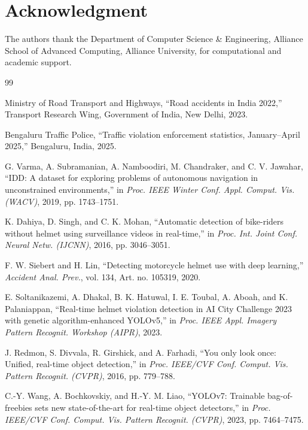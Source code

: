 \documentclass[conference]{IEEEtran}
\begin{document}
\section*{Acknowledgment}
The authors thank the Department of Computer Science \& Engineering, Alliance School of Advanced Computing, Alliance University, for computational and academic support.

\begin{thebibliography}{99}

Ministry of Road Transport and Highways, ``Road accidents in India 2022,'' Transport Research Wing, Government of India, New Delhi, 2023.

Bengaluru Traffic Police, ``Traffic violation enforcement statistics, January--April 2025,'' Bengaluru, India, 2025.

G. Varma, A. Subramanian, A. Namboodiri, M. Chandraker, and C. V. Jawahar, ``IDD: A dataset for exploring problems of autonomous navigation in unconstrained environments,'' in \emph{Proc. IEEE Winter Conf. Appl. Comput. Vis. (WACV)}, 2019, pp. 1743--1751.

K. Dahiya, D. Singh, and C. K. Mohan, ``Automatic detection of bike-riders without helmet using surveillance videos in real-time,'' in \emph{Proc. Int. Joint Conf. Neural Netw. (IJCNN)}, 2016, pp. 3046--3051.

F. W. Siebert and H. Lin, ``Detecting motorcycle helmet use with deep learning,'' \emph{Accident Anal. Prev.}, vol. 134, Art. no. 105319, 2020.

E. Soltanikazemi, A. Dhakal, B. K. Hatuwal, I. E. Toubal, A. Aboah, and K. Palaniappan, ``Real-time helmet violation detection in AI City Challenge 2023 with genetic algorithm-enhanced YOLOv5,'' in \emph{Proc. IEEE Appl. Imagery Pattern Recognit. Workshop (AIPR)}, 2023.

J. Redmon, S. Divvala, R. Girshick, and A. Farhadi, ``You only look once: Unified, real-time object detection,'' in \emph{Proc. IEEE/CVF Conf. Comput. Vis. Pattern Recognit. (CVPR)}, 2016, pp. 779--788.

C.-Y. Wang, A. Bochkovskiy, and H.-Y. M. Liao, ``YOLOv7: Trainable bag-of-freebies sets new state-of-the-art for real-time object detectors,'' in \emph{Proc. IEEE/CVF Conf. Comput. Vis. Pattern Recognit. (CVPR)}, 2023, pp. 7464--7475.


\end{thebibliography}
\end{document}
